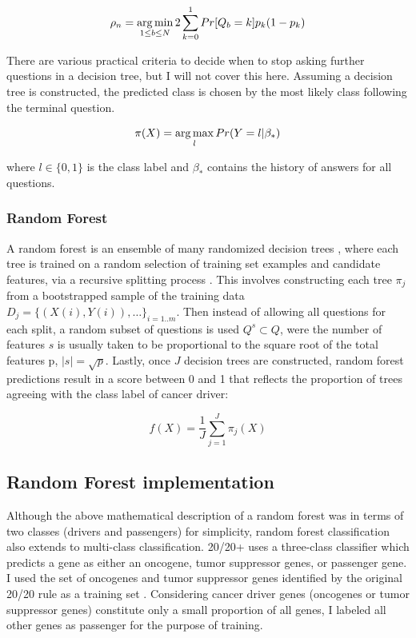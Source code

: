 \begin{equation}
\rho_n=\operatorname*{arg\,min}_{1 \leq b \leq N}{2\sum_{k=0}^{1}{Pr[Q_b=k]p_k(1-p_k)}}
\end{equation}

There are various practical criteria to decide when to stop asking further questions in a decision tree, but I will not cover this here. Assuming a decision tree is constructed, the predicted class is chosen by the most likely class following the terminal question.

\begin{equation}
\pi(X) = \operatorname*{arg\,max}_l{Pr(Y=l|\beta_*)}
\end{equation}

where $l\in \{0,1\}$ is the class label and $\beta_*$ contains the history of answers for all questions. 

\subsubsection{Random Forest}

A random forest is an ensemble of many randomized decision trees \cite{RN41, RN40}, where each tree is trained on a random selection of training set examples and candidate features, via a recursive splitting process \cite{RN89}. This involves constructing each tree $\pi_j$ from a bootstrapped sample of the training data $D_j=\{(X(i),Y(i)),\ldots\}_{i=1..m}$. Then instead of allowing all questions for each split, a random subset of questions is used $Q^s\subset Q$, were the number of features $s$ is usually taken to be proportional to the square root of the total features p,  $|s|=\sqrt{p}$. Lastly, once $J$ decision trees are constructed, random forest predictions result in a score between 0 and 1 that reflects the proportion of trees agreeing with the class label of cancer driver:

\begin{equation}
f(X) = \frac{1}{J}\sum_{j=1}^J{\pi_j(X)}
\end{equation}

\subsection{Random Forest implementation}

Although the above mathematical description of a random forest was in terms of two classes (drivers and passengers) for simplicity, random forest classification also extends to multi-class classification. 20/20+ uses a three-class classifier which predicts a gene as either an oncogene, tumor suppressor genes, or passenger gene. I used the set of oncogenes and tumor suppressor genes identified by the original 20/20 rule as a training set \cite{RN25}. Considering cancer driver genes (oncogenes or tumor suppressor genes) constitute only a small proportion of all genes, I labeled all other genes as passenger for the purpose of training. 

